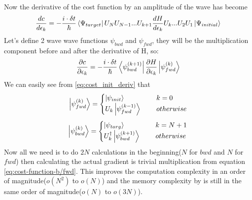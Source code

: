 \documentclass[english, a4paper, 12pt, twoside]{article}
\numberwithin{equation}{section} %
\begin{document}
Now the derivative of the cost function by an amplitude of the wave has become
\begin{equation} \label{eq:cost_init_deriv}
    \frac{dc}{d\epsilon_k} = -\frac{i\cdot \delta t}{\hbar} \bra{\Psi_{target}}U_N U_{N-1}... U_{k+1}\frac{dH}{d\epsilon_k} U_{k} ...U_2 U_1\ket{\Psi_{initial}} 
\end{equation}
Let's define 2 wave wave functions $\psi_{bwd}$ and $\psi_{fwd}$, they will be the multiplication component before and after the derivative of H, so:
\begin{equation} \label{eq:cost-function-b/fwd}
    \frac{\partial c}{\partial \epsilon_k} =  -\frac{i\cdot \delta t}{\hbar}\bra{\psi_{bwd}^{(k+1)}} \frac{\partial H}{\partial \epsilon_k} \ket{\psi_{fwd}^{(k)}}
\end{equation}
We can easily see from \ref{eq:cost_init_deriv} that 
\[   
\ket{\psi_{fwd}^{(k)}} = 
     \begin{cases}
       \ket{\psi_{init}} &\quad\ k=0\\
       U_k \ket{\psi_{fwd}^{(k-1)}} &\quad\ otherwise\\
     \end{cases}
\]
\[   
\ket{\psi_{bwd}^{(k)}} = 
     \begin{cases}
       \ket{\psi_{targ}} &\quad\ k=N+1\\
       U_k^{\dag{}} \ket{\psi_{bwd}^{(k+1)}} &\quad\ otherwise\\
     \end{cases}
\]
Now all we need is to do $2N$ calculations in the beginning($N$ for $bwd$ and $N$ for $fwd$) then calculating the actual gradient is trivial multiplication from equation \ref{eq:cost-function-b/fwd}. This improves the computation complexity in an order of magnitude($o(N^2)$ to $o(N)$) and the memory complexity by is still in the same order of magnitude($o(N)$ to $o(3N)$).
\end{document}
